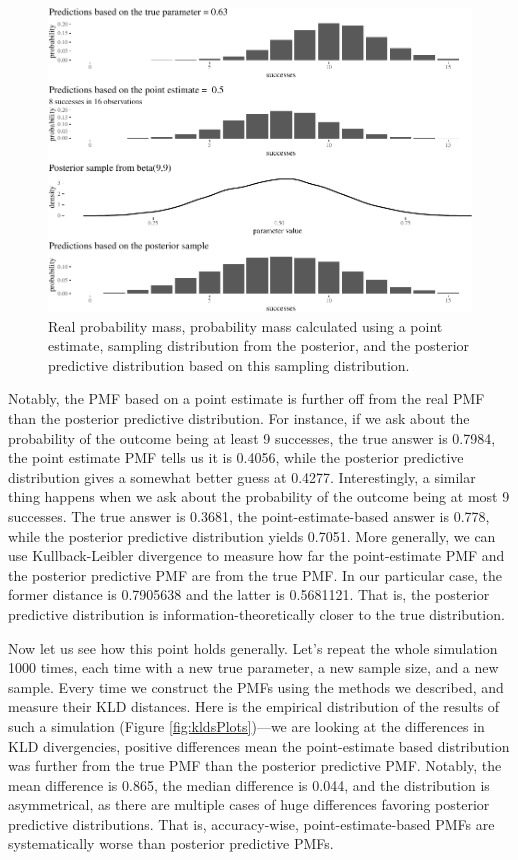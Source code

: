 \documentclass[
  10pt,
  dvipsnames,enabledeprecatedfontcommands]{scrartcl}
\begin{document}
\begin{figure}[H]

\begin{center}\includegraphics[width=0.9\linewidth]{chapter-outline_files/figure-latex/fig:posteriorPrediction2-1} \end{center}


\caption{Real probability mass, probability mass calculated using a point estimate, sampling distribution from the posterior, and the posterior predictive distribution based on this sampling distribution.}
\label{fig:posteriorPrediction}
\end{figure}

Notably, the PMF based on a point estimate is further off from the real
PMF than the posterior predictive distribution. For instance, if we ask
about the probability of the outcome being at least 9 successes, the
true answer is 0.7984, the point estimate PMF tells us it is 0.4056,
while the posterior predictive distribution gives a somewhat better
guess at 0.4277. Interestingly, a similar thing happens when we ask
about the probability of the outcome being at most 9 successes. The true
answer is 0.3681, the point-estimate-based answer is 0.778, while the
posterior predictive distribution yields 0.7051. More generally, we can
use Kullback-Leibler divergence to measure how far the point-estimate
PMF and the posterior predictive PMF are from the true PMF. In our
particular case, the former distance is 0.7905638 and the latter is
0.5681121. That is, the posterior predictive distribution is
information-theoretically closer to the true distribution.

Now let us see how this point holds generally. Let's repeat the whole
simulation 1000 times, each time with a new true parameter, a new sample
size, and a new sample. Every time we construct the PMFs using the
methods we described, and measure their KLD distances. Here is the
empirical distribution of the results of such a simulation (Figure
\ref{fig:kldsPlots})---we are looking at the differences in KLD
divergencies, positive differences mean the point-estimate based
distribution was further from the true PMF than the posterior predictive
PMF. Notably, the mean difference is 0.865, the median difference is
0.044, and the distribution is asymmetrical, as there are multiple cases
of huge differences favoring posterior predictive distributions. That
is, accuracy-wise, point-estimate-based PMFs are systematically worse
than posterior predictive PMFs.
\end{document}
